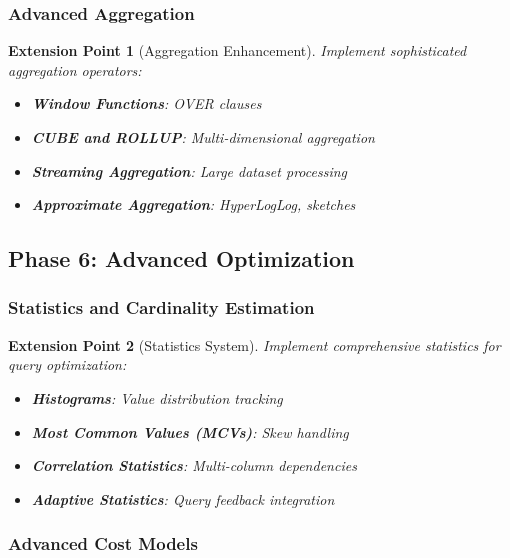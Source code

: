 \documentclass[12pt,a4paper]{article}
\newtheorem{extension}{Extension Point}[section]
\begin{document}
    \subsubsection{Advanced Aggregation}

    \begin{extension}[Aggregation Enhancement]
        Implement sophisticated aggregation operators:

        \begin{itemize}
            \item \textbf{Window Functions}: OVER clauses
            \item \textbf{CUBE and ROLLUP}: Multi-dimensional aggregation
            \item \textbf{Streaming Aggregation}: Large dataset processing
            \item \textbf{Approximate Aggregation}: HyperLogLog, sketches
        \end{itemize}
    \end{extension}

    \subsection{Phase 6: Advanced Optimization}

    \subsubsection{Statistics and Cardinality Estimation}

    \begin{extension}[Statistics System]
        Implement comprehensive statistics for query optimization:

        \begin{itemize}
            \item \textbf{Histograms}: Value distribution tracking
            \item \textbf{Most Common Values (MCVs)}: Skew handling
            \item \textbf{Correlation Statistics}: Multi-column dependencies
            \item \textbf{Adaptive Statistics}: Query feedback integration
        \end{itemize}
    \end{extension}

    \subsubsection{Advanced Cost Models}
\end{document}
